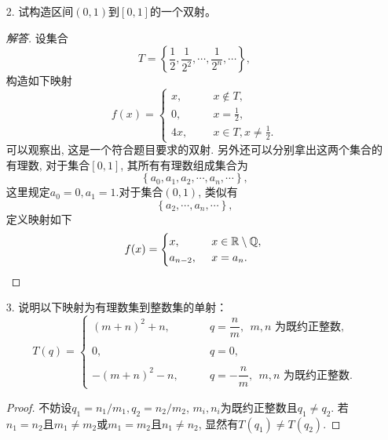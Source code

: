\begin{1a}
\begin{enumerate}
\begin{proof}
    或者令\(x=0\), 立即得\(a_0=0\), 于是得到
    \[a_nx^n+a_{n-1}x^{n-1}+\cdots+a_1x=0.\]
    上式两端除以\(x\), 此时假定\(x\ne 0\), 得到
    \[a_nx^{n-1}+a_{n-1}x^{n-2}+\cdots+a_1=0,\]令\(x=0\)得到\(a_1=0\). 循环该流程, 可得结论.
\end{proof}
\item[2.] 试构造区间\((0,1)\)到\([0,1]\)的一个双射。
\begin{proof}[解答]
设集合
    \[T=\left\lbrace\frac{1}{2},\frac{1}{2^2},\cdots,\frac{1}{2^n},\cdots\right\rbrace,\]
    构造如下映射\[f(x)=\begin{cases}
        x,\qquad &x\notin T,\\
        0, &x=\frac{1}{2},\\
        4x,& x\in T,x\ne \frac{1}{2}.
    \end{cases}\]
    可以观察出, 这是一个符合题目要求的双射. 
    另外还可以分别拿出这两个集合的有理数, 对于集合\([0,1]\), 其所有有理数组成集合为
    \[\left\lbrace a_0,a_1,a_2,\cdots,a_n,\cdots \right\rbrace,\] 
    这里规定\(a_0=0,a_1=1.\)对于集合\((0,1)\), 类似有
    \[\left\lbrace a_2,\cdots,a_n,\cdots \right\rbrace,\] 
    定义映射如下\[f(x)=\begin{cases}
        x,\qquad &x\in \mathbb{R}\setminus\mathbb{Q},\\
        a_{n-2},&x=a_n.
    \end{cases}\qedhere\]
\end{proof}
\item[3.] 说明以下映射为有理数集到整数集的单射：\[T(q)=\begin{cases}
        (m+n)^2+n,\qquad & q=\dfrac{n}{m},\ \ m,n \text{ 为既约正整数},\\ \\
        0,&q=0,\\ \\
        -(m+n)^2-n,\qquad & q=-\dfrac{n}{m},\ \ m,n \text{ 为既约正整数}.
    \end{cases}\]
\begin{proof}
不妨设\(q_1=n_1/m_1,q_2=n_2/m_2\), \(m_i,n_i\)为既约正整数且\(q_1\ne q_2\). 
若\(n_1=n_2\)且\(m_1\ne m_2\)或\(m_1=m_2\)且\(n_1\ne n_2\), 显然有\(T(q_1)\ne T(q_2)\). 


\end{proof}
\end{enumerate}
\end{1a}
